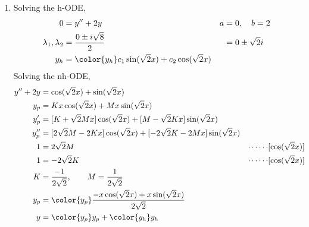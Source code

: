 \begin{enumerate}
    \item Solving the h-ODE,
          \begin{align}
              0                        & = y'' + 2y                                                & a & = 0, \quad b = 2  \\
              \lambda_{1}, \lambda_{2} & = \frac{0 \pm i\sqrt{8}}{2}                               &   & = 0 \pm \sqrt{2}i \\
              y_{h}                    & = \color{y_h} c_{1}\sin(\sqrt{2}x) + c_{2}\cos(\sqrt{2}x)
          \end{align}
          Solving the nh-ODE,
          \begin{align}
              y'' + 2y & = \cos(\sqrt{2}x) + \sin(\sqrt{2}x)                                                                           \\
              y_{p}    & = Kx \cos(\sqrt{2}x) + Mx \sin(\sqrt{2}x)                                                                     \\
              y_{p}'   & = [K + \sqrt{2}Mx] \cos(\sqrt{2}x) + [M - \sqrt{2}Kx] \sin(\sqrt{2}x)                                         \\
              y_{p}''  & = [2\sqrt{2}M - 2Kx] \cos(\sqrt{2}x) + [-2\sqrt{2}K - 2Mx] \sin(\sqrt{2}x)                                    \\
              1        & = 2\sqrt{2}M                                                               & \cdots\cdots & [\cos(\sqrt{2}x)] \\
              1        & = -2\sqrt{2}K                                                              & \cdots\cdots & [\cos(\sqrt{2}x)] \\
              K        & = \frac{-1}{2\sqrt{2}}, \qquad M = \frac{1}{2\sqrt{2}}                                                        \\
              y_{p}    & = \color{y_p} \frac{-x\cos(\sqrt{2}x) + x\sin(\sqrt{2}x)}{2\sqrt{2}}                                          \\
              y        & = {\color{y_p} y_{p}} + {\color{y_h} y_{h}}
          \end{align}


\end{enumerate}
